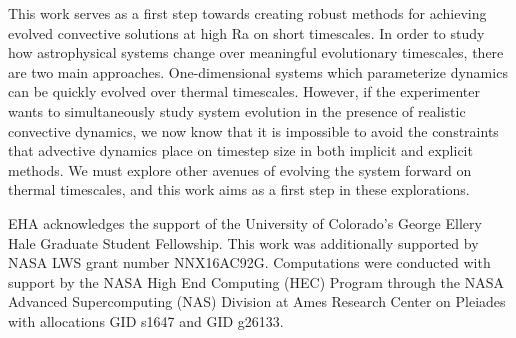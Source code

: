 \documentclass[aps, pre, onecolumn, nofootinbib, notitlepage, groupedaddress, amsfonts, amssymb, amsmath, longbibliography]{revtex4-1}
\begin{document}
This work serves as a first step towards creating robust methods for
achieving evolved convective solutions at high Ra on short timescales.
In order to study how astrophysical systems change over meaningful
evolutionary timescales, there are two main approaches.  One-dimensional
systems which parameterize dynamics can be quickly evolved over thermal timescales.
However, if the experimenter wants to simultaneously study system evolution
in the presence of realistic convective dynamics, we now know that it is
impossible to avoid the constraints that advective dynamics place on
timestep size \cite{viallet&all2011, viallet&all2013, viallet&all2016}
in both implicit and explicit methods. We must explore other avenues
of evolving the system forward on thermal timescales, and this work aims
as a first step in these explorations.


\begin{acknowledgments}
EHA acknowledges the support of the University of Colorado's George 
Ellery Hale Graduate Student Fellowship.
This work was additionally supported by  NASA LWS grant number NNX16AC92G.  
Computations were conducted 
with support by the NASA High End Computing (HEC) Program through the NASA 
Advanced Supercomputing (NAS) Division at Ames Research Center on Pleiades
with allocations GID s1647 and GID g26133.
\end{acknowledgments}


\appendix
\end{document}
